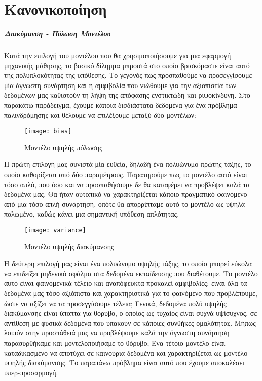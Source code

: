 \chapter{Κανονικοποίηση}
\label{appendix:Reg}
\paragraph{Διακύμανση - Πόλωση Μοντέλου}
Κατά την επιλογή του μοντέλου που θα χρησιμοποιήσουμε για μια εφαρμογή μηχανικής μάθησης, το βασικό δίλημμα μπροστά στο οποίο βρισκόμαστε είναι αυτό της πολυπλοκότητας της υπόθεσης. Το γεγονός πως προσπαθούμε να προσεγγίσουμε μία άγνωστη συνάρτηση και η αμφιβολία που νιώθουμε για την αξιοπιστία των δεδομένων μας καθιστούν τη λήψη της απόφασης ενστικτώδη και ριψοκίνδυνη. Στο παρακάτω παράδειγμα, έχουμε κάποια δισδιάστατα δεδομένα για ένα πρόβλημα παλινδρόμησης και θέλουμε να επιλέξουμε μεταξύ δύο μοντέλων:

\begin{figure}[!htb]
	\centering			
	\texttt{[image: bias]}
	\caption[Μοντέλο υψηλής πόλωσης]{Μοντέλο υψηλής πόλωσης}
\end{figure}

Η πρώτη επιλογή μας συνιστά μία ευθεία, δηλαδή ένα πολυώνυμο πρώτης τάξης, το οποίο καθορίζεται από δύο παραμέτρους. Παρατηρούμε πως το μοντέλο αυτό είναι τόσο απλό, που όσο και να προσπαθήσουμε δε θα καταφέρει να προβλέψει καλά τα δεδομένα μας. Θα ήταν ουτοπικό να χαρακτηρίζεται κάποιο πραγματικό φαινόμενο από μια τόσο απλή συνάρτηση, οπότε θα απορρίπταμε αυτό το μοντέλο ως υψηλά πολωμένο, καθώς κάνει μια σημαντική υπόθεση απλότητας.

\begin{figure}[!htb]
	\centering			
	\texttt{[image: variance]}
	\caption[Μοντέλο υψηλής διακύμανσης]{Μοντέλο υψηλής διακύμανσης}
\end{figure}

Η δεύτερη επιλογή μας είναι ένα πολυώνυμο υψηλής τάξης, το οποίο μπορεί εύκολα να επιδείξει μηδενικό σφάλμα στα δεδομένα εκπαίδευσης που διαθέτουμε. Το μοντέλο αυτό είναι φαινομενικά τέλειο και αναπόφευκτα προκαλεί αμφιβολίες: είναι όλα τα δεδομένα μας τόσο αξιόπιστα και χαρακτηριστικά για το φαινόμενο που προβλέπουμε, ώστε να αξίζει να τα προσεγγίσουμε τέλεια; Γενικά, δεδομένα πολύ υψηλής διακύμανσης είναι ύποπτα για θόρυβο, ο οποίος ως τυχαίος είναι συχνά υψίσυχνος, σε αντίθεση με φυσικά δεδομένα που υπακούν σε κάποιες συνθήκες ομαλότητας. Μήπως λοιπόν στην προσπάθειά μας να προβλέψουμε καλά την άγνωστη συνάρτηση παρασυρθήκαμε και μοντελοποιήσαμε το θόρυβο; Ένα τέτοιο μοντέλο είναι καταδικασμένο να αποτύχει σε καινούρια δεδομένα και χαρακτηρίζεται ως μοντέλο υψηλής διακύμανσης. Το παραπάνω πρόβλημα είναι αυτό που έχουμε αποκαλέσει υπερ-προσαρμογή.

